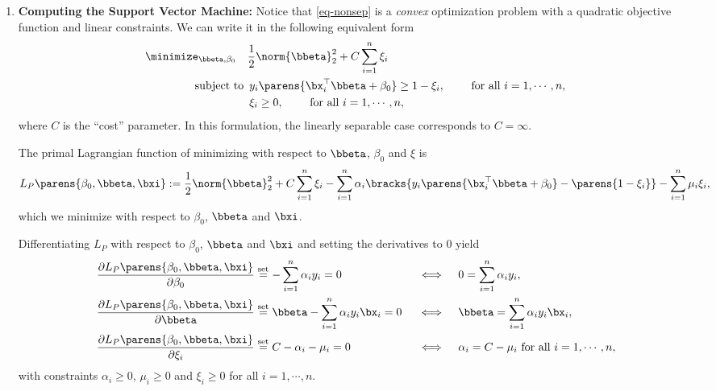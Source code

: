 \documentclass[12pt]{article}
\begin{document}
\begin{enumerate}[label=\textbf{\arabic*.}]
	\item \textbf{Computing the Support Vector Machine:} Notice that \eqref{eq-nonsep} is a \emph{convex} optimization problem with a quadratic objective function and linear constraints. We can write it in the following equivalent form 
	\begin{equation}\label{eqnonsep}
		\begin{aligned}
			\minimize_{\bbeta, \beta_0} \hspace{10pt} & \frac{1}{2} \norm{\bbeta}_2^2 + C \sum_{i=1}^n \xi_i \\
			\text{subject to } & \, y_i \parens{\bx_i^\top \bbeta + \beta_0} \ge 1 - \xi_i, \qquad \text{ for all } i = 1, \cdots, n, \\ 
			& \, \xi_i \ge 0, \qquad \text{ for all } i = 1, \cdots, n, 
		\end{aligned}
	\end{equation}
	where $C$ is the ``cost'' parameter. In this formulation, the linearly separable case corresponds to $C = \infty$. 
	
	The primal Lagrangian function of minimizing with respect to $\bbeta$, $\beta_0$ and $\xi$ is 
	\begin{equation*}
		L_P \parens{\beta_0, \bbeta, \bxi} := \frac{1}{2} \norm{\bbeta}_2^2 + C \sum_{i=1}^n \xi_i - \sum_{i=1}^n \alpha_i \bracks{ y_i \parens{\bx_i^\top \bbeta + \beta_0} - \parens{1 - \xi_i}} - \sum_{i=1}^n \mu_i \xi_i, 
	\end{equation*}
	which we minimize with respect to $\beta_0$, $\bbeta$ and $\bxi$. 
	
	Differentiating $L_P$ with respect to $\beta_0$, $\bbeta$ and $\bxi$ and setting the derivatives to 0 yield 
	\begin{align*}
		& \, \frac{\partial L_P \parens{\beta_0, \bbeta, \bxi}}{\partial \beta_0} \stackrel{\mathrm{set}}{=} - \sum_{i=1}^n \alpha_i y_i = 0 && \, \iff && \, 0 = \sum_{i=1}^n \alpha_i y_i, \\
		& \, \frac{\partial L_P \parens{\beta_0, \bbeta, \bxi}}{\partial \bbeta} \stackrel{\mathrm{set}}{=} \bbeta - \sum_{i=1}^n \alpha_i y_i \bx_i = 0 && \, \iff && \, \bbeta = \sum_{i=1}^n \alpha_i y_i \bx_i, \\
		& \, \frac{\partial L_P \parens{\beta_0, \bbeta, \bxi}}{\partial \xi_i} \stackrel{\mathrm{set}}{=} C - \alpha_i - \mu_i = 0 && \, \iff && \, \alpha_i = C - \mu_i \text{ for all } i = 1, \cdots, n, 
	\end{align*} 
	with constraints $\alpha_i \ge 0$, $\mu_i \ge 0$ and $\xi_i \ge 0$ for all $i = 1, \cdots, n$. 
	

\end{enumerate}
\end{document}
